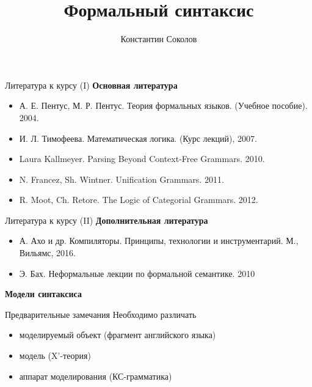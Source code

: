 \documentclass{beamer}
\begin{document}
\title{\large{\sc Формальный синтаксис}}
\author{Константин Соколов}

\begin{frame}
    \thispagestyle{empty}
    \titlepage
\end{frame}

\begin{frame}{Литература к курсу (I)}
\textbf{Основная литература}
\bigskip
\begin{itemize}
	\item А. Е. Пентус, М. Р. Пентус. Теория формальных языков. (Учебное пособие). 2004.
	\item И. Л. Тимофеева. Математическая логика. (Курс лекций), 2007.
	\item Laura Kallmeyer. Parsing Beyond Context-Free Grammars. 2010.
	\item N. Francez, Sh. Wintner. Unification Grammars. 2011.
	\item R. Moot, Ch. Retore. The Logic of Categorial Grammars. 2012.
\end{itemize}
\end{frame}

\begin{frame}{Литература к курсу (II)}
\textbf{Дополнительная литература}
\bigskip
\begin{itemize}
	\item А. Ахо и др. Компиляторы. Принципы, технологии и инструментарий. М., Вильямс, 2016.
	\item Э. Бах. Неформальные лекции по формальной семантике. 2010
\end{itemize}
\end{frame}


\begin{frame}{}
\begin{center}
	\textbf{Модели синтаксиса}
\end{center}
\end{frame}

\begin{frame}{Предварительные замечания}
Необходимо различать
\bigskip
\begin{itemize}
	\item моделируемый объект (фрагмент английского языка)
	\item модель (X'-теория)
	\item аппарат моделирования (КС-грамматика)
\end{itemize}
\end{frame}
\end{document}
